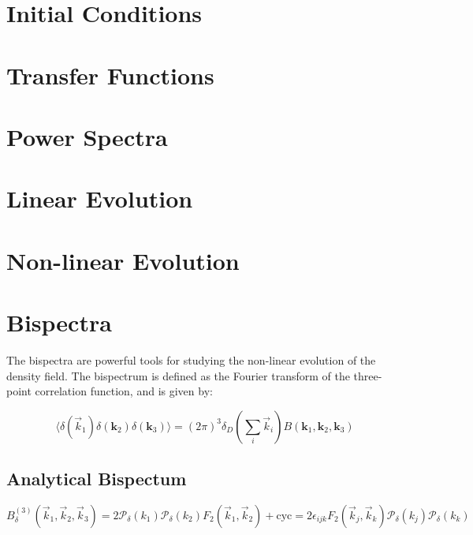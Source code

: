 %
%

\section{Initial Conditions}

\section{Transfer Functions}

\section{Power Spectra}
    

\section{Linear Evolution}

\section{Non-linear Evolution} 

\section{Bispectra} 

    The bispectra are powerful tools for studying the non-linear evolution of the density field. The bispectrum is defined as the Fourier transform of the three-point correlation function, and is given by:

    \begin{equation}
        \langle \delta(\vec{k}_1) \delta(\mathbf{k}_2) \delta(\mathbf{k}_3) \rangle = (2\pi)^3 \delta_D\left(\sum_i\vec{k}_i\right) B(\mathbf{k}_1, \mathbf{k}_2, \mathbf{k}_3)
    \end{equation}


    \subsection{Analytical Bispectum}
        \begin{equation}
            B^{(3)}_\delta(\vec{k}_1,\vec{k}_2,\vec{k}_3) = 2\mathcal{P}_\delta(k_1)\mathcal{P}_\delta(k_2)F_2(\vec{k}_1, \vec{k}_2) + \mathrm{cyc} = 2\epsilon_{ijk}F_2(\vec{k}_j,\vec{k}_k)\mathcal{P}_\delta(k_j)\mathcal{P}_\delta(k_k)
        \end{equation}


